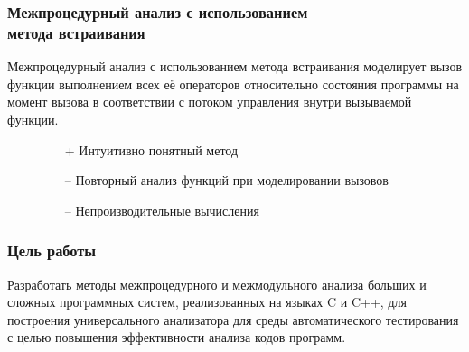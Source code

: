 \documentclass[hyperref={pdfpagelabels=false},10pt]{beamer}
\begin{document}
\begin{frame}
\frametitle{Межпроцедурный анализ с использованием\\метода встраивания}
Межпроцедурный анализ с использованием метода встраивания моделирует вызов функции выполнением всех её операторов относительно состояния программы на момент вызова в соответствии с потоком управления внутри вызываемой функции.
\vspace{10pt}
\begin{figure}[h]
  \begin{minipage}[h]{0.49\linewidth}
  \end{minipage}
  \hfill
  \begin{minipage}[h]{0.49\linewidth}
  \end{minipage}
  \vspace{5pt}

  \begin{minipage}[h]{0.49\linewidth}
  \begin{itemize}
    \item[+] Интуитивно понятный метод
  \end{itemize}
  \end{minipage}
  \hfill
  \begin{minipage}[h]{0.49\linewidth}
\begin{itemize}
 \item[--] Повторный анализ функций при моделировании вызовов
 \item[--] Непроизводительные вычисления
\end{itemize}
  \end{minipage}
\end{figure}
\end{frame}

\begin{frame}
\frametitle{Цель работы}
Разработать методы межпроцедурного и межмодульного анализа больших и сложных программных систем, реализованных на языках C и C++, для построения универсального анализатора для среды автоматического тестирования с целью повышения эффективности анализа кодов программ.
\end{frame}
\end{document}
